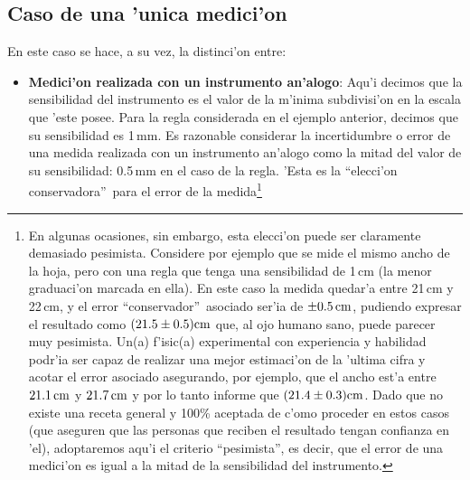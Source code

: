 \documentclass[a4paper]{report}
\begin{document}
\subsection{Caso de una 'unica medici'on}
En este caso se hace, a su vez, la distinci'on entre:
\begin{itemize}
\item \textbf{Medici'on realizada con un instrumento an'alogo}: Aqu'i decimos que la sensibilidad del instrumento es el valor de la m'inima subdivisi'on en la escala que 'este posee. Para la regla considerada en el ejemplo anterior, decimos que su sensibilidad es 1\,mm. Es razonable considerar la incertidumbre o error de una medida realizada con un instrumento an'alogo como la mitad del valor de su sensibilidad: 0.5\,mm en el caso de la regla. 'Esta es la ``elecci'on conservadora''\, para el error de la medida\footnote{En algunas ocasiones, sin embargo, esta elecci'on puede ser claramente demasiado pesimista. Considere por ejemplo que se mide el mismo ancho de la hoja, pero con una regla que tenga una sensibilidad de 1\,cm (la menor graduaci'on marcada en ella). En este caso la medida quedar'a entre 21\,cm y 22\,cm, y el error ``conservador''\, asociado ser'ia de $\pm 0.5\,\rm cm$, pudiendo expresar el resultado como $(21.5\pm 0.5)\rm cm$ que, al ojo humano sano, puede parecer muy pesimista. Un(a) f'isic(a) experimental con experiencia y habilidad podr'ia ser capaz de realizar una mejor estimaci'on de la 'ultima cifra y acotar el error asociado asegurando, por ejemplo, que el ancho est'a entre $21.1\,\rm cm$ y $21.7\,\rm cm$ y por lo tanto informe que $(21.4\pm 0.3)\rm cm$. Dado que no existe una receta general y 100\% aceptada de c'omo proceder en estos casos (que aseguren que las personas que reciben el resultado tengan confianza en 'el), adoptaremos aqu'i el criterio ``pesimista'', es decir, que el error de una medici'on es igual a la mitad de la sensibilidad del instrumento.}


\end{itemize}
\end{document}
